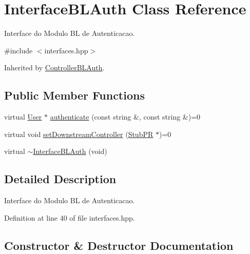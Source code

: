 \hypertarget{class_interface_b_l_auth}{}\section{Interface\+B\+L\+Auth Class Reference}
\label{class_interface_b_l_auth}


Interface do Modulo BL de Autenticacao.  




{\ttfamily \#include $<$interfaces.\+hpp$>$}



Inherited by \hyperlink{class_controller_b_l_auth}{Controller\+B\+L\+Auth}.

\subsection*{Public Member Functions}
\begin{DoxyCompactItemize}
\item 
virtual \hyperlink{class_user}{User} $\ast$ \hyperlink{class_interface_b_l_auth_a326fb6aafafebecbbaf0db346633c996}{authenticate} (const string \&, const string \&)=0
\item 
virtual void \hyperlink{class_interface_b_l_auth_a738de797493eb2def64b6bf23b911a23}{set\+Downstream\+Controller} (\hyperlink{class_stub_p_r}{Stub\+PR} $\ast$)=0
\item 
virtual \hyperlink{class_interface_b_l_auth_a316bd5b6bd0db52c3f82ce81e0dfd1fa}{$\sim$\+Interface\+B\+L\+Auth} (void)
\end{DoxyCompactItemize}


\subsection{Detailed Description}
Interface do Modulo BL de Autenticacao. 

Definition at line 40 of file interfaces.\+hpp.



\subsection{Constructor \& Destructor Documentation}
\mbox{\label{class_interface_b_l_auth_a316bd5b6bd0db52c3f82ce81e0dfd1fa}} 
